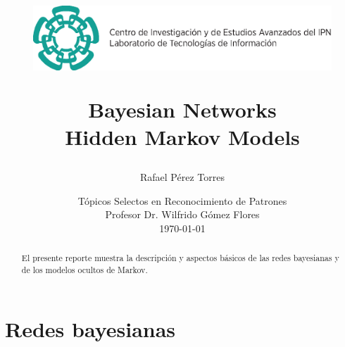 \documentclass{article}
\begin{document}
	\title{
	\begin{figure}[!ht]
		\flushleft
			\includegraphics[width=\textwidth]{resources/images/cinvestav-header}
	\end{figure}
	\vspace{1cm}
	\Huge Bayesian Networks \\ Hidden Markov Models 
	\vspace{1cm}
	}
	
	
	
	\author{Rafael Pérez Torres}	
	
	
	\date{
	\large Tópicos Selectos en Reconocimiento de Patrones \\ 
	\vspace{0.8cm}
	\large Profesor Dr. Wilfrido Gómez Flores \\
	\vspace{1cm}
	\today
	}

	\maketitle
	\setlength{\parindent}{0pt}

\begin{abstract}
El presente reporte muestra la descripción y aspectos básicos de las redes bayesianas y de los modelos ocultos de Markov.
\end{abstract}
	\newpage
	\tableofcontents
	\newpage
	

\section{Redes bayesianas} 
\label{sec:bayesian-networks}
\end{document}
